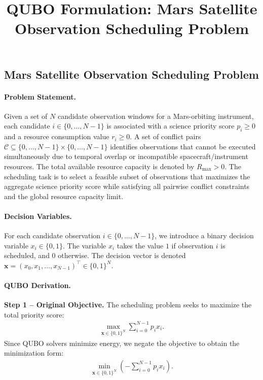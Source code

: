 \documentclass[12pt]{article}
\title{QUBO Formulation: Mars Satellite Observation Scheduling Problem}
\date{}
\begin{document}
\maketitle

\subsection*{Mars Satellite Observation Scheduling Problem}

\paragraph{Problem Statement.}
Given a set of $N$ candidate observation windows for a Mars-orbiting instrument, each candidate $i \in \{0, \dots, N-1\}$ is associated with a science priority score $p_i \geq 0$ and a resource consumption value $r_i \geq 0$. A set of conflict pairs $\mathcal{C} \subseteq \{0, \dots, N-1\} \times \{0, \dots, N-1\}$ identifies observations that cannot be executed simultaneously due to temporal overlap or incompatible spacecraft/instrument resources. The total available resource capacity is denoted by $R_{\max} > 0$. The scheduling task is to select a feasible subset of observations that maximizes the aggregate science priority score while satisfying all pairwise conflict constraints and the global resource capacity limit.

\paragraph{Decision Variables.}
For each candidate observation $i \in \{0, \dots, N-1\}$, we introduce a binary decision variable $x_i \in \{0, 1\}$. The variable $x_i$ takes the value $1$ if observation $i$ is scheduled, and $0$ otherwise. The decision vector is denoted $\mathbf{x} = (x_0, x_1, \dots, x_{N-1})^\top \in \{0, 1\}^N$.

\paragraph{QUBO Derivation.}
\textbf{Step 1 -- Original Objective.} The scheduling problem seeks to maximize the total priority score:
\begin{align}
    \max_{\mathbf{x} \in \{0,1\}^N} \sum_{i=0}^{N-1} p_i x_i.
\end{align}
Since QUBO solvers minimize energy, we negate the objective to obtain the minimization form:
\begin{align}
    \min_{\mathbf{x} \in \{0,1\}^N} \left( -\sum_{i=0}^{N-1} p_i x_i \right).
\end{align}
\end{document}
